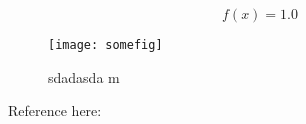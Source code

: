 \documentclass{memoir}
\begin{document}
\begin{equation}
  f(x) = 1.0
  \label{eq:eq1}
\end{equation}

\begin{figure}[tbp]
  \centering
  \texttt{[image: somefig]}
  \caption{sdadasda \si{\m}}
  \label{fig:fig1}
\end{figure}

Reference here: 
\end{document}
